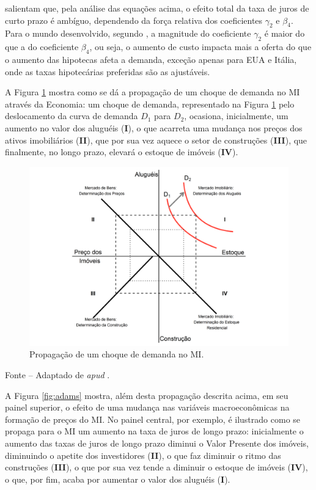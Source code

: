 \documentclass[
	12pt,				%
	oneside,			%
	a4paper,			%
	chapter=TITLE,		%
	section=TITLE,		%
	english,			%
	brazil				%
	]{abntex2}
\newcommand{\bcenter}{\begin{center}}
\newcommand{\ecenter}{\end{center}}
\begin{document}
\begin{refsection}
\textcite{ADAMS2010} salientam que, pela análise das equações acima, o efeito total da taxa
de juros de curto prazo é ambíguo, dependendo da força relativa dos coeficientes
\(\gamma_2\) e \(\beta_4\). Para o mundo desenvolvido, segundo \textcite[p.~15]{ADAMS2010},
a magnitude do coeficiente \(\gamma_2\) é maior do que a do coeficiente \(\beta_4\),
ou seja, o aumento de custo impacta mais a oferta do que o aumento das hipotecas
afeta a demanda, exceção apenas para \gls{EUA} e Itália, onde as taxas hipotecárias
preferidas são as ajustáveis.

A Figura \ref{fig:macroInfluence} mostra como se dá a propagação de um choque
de demanda no \gls{MI} através da Economia: um choque de demanda, representado
na Figura \ref{fig:macroInfluence} pelo deslocamento da curva de demanda \(D_1\)
para \(D_2\), ocasiona, inicialmente, um aumento no valor dos aluguéis (\textbf{I}), o
que acarreta uma mudança nos preços dos ativos imobiliários (\textbf{II}), que por
sua vez aquece o setor de construções (\textbf{III}), que finalmente, no longo prazo,
elevará o estoque de imóveis (\textbf{IV}).
\begin{figure}[H]

{\centering \includegraphics[width=0.7\linewidth]{images/macroInfluence-1} 

}

\caption{Propagação de um choque de demanda no \gls{MI}.}\label{fig:macroInfluence}
\end{figure}
\bcenter

\small Fonte -- Adaptado de \textcite{diPasquale} \emph{apud} \textcite{ADAMS2010}.
\ecenter

A Figura \ref{fig:adams} mostra, além desta propagação descrita acima, em seu
painel superior, o efeito de uma mudança nas variáveis macroeconômicas na
formação de preços do \gls{MI}. No painel central, por exemplo, é ilustrado como
se propaga para o \gls{MI} um aumento na taxa de juros de longo prazo:
inicialmente o aumento das taxas de juros de longo prazo diminui o Valor
Presente dos imóveis, diminuindo o apetite dos investidores (\textbf{II}), o que faz
diminuir o ritmo das construções (\textbf{III}), o que por sua vez tende a diminuir o
estoque de imóveis (\textbf{IV}), o que, por fim, acaba por aumentar o valor dos
aluguéis (\textbf{I}).


\end{refsection}
\end{document}
